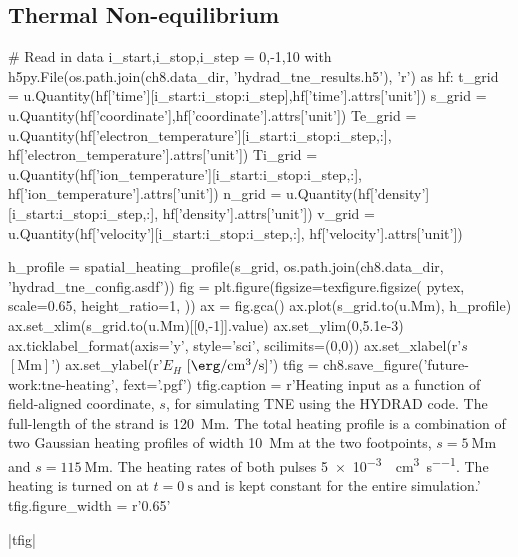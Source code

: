 \subsection{Thermal Non-equilibrium}\label{sec:tne}

\begin{pycode}[chapter8]
# Read in data
i_start,i_stop,i_step = 0,-1,10
with h5py.File(os.path.join(ch8.data_dir, 'hydrad_tne_results.h5'), 'r') as hf:
    t_grid = u.Quantity(hf['time'][i_start:i_stop:i_step],hf['time'].attrs['unit'])
    s_grid = u.Quantity(hf['coordinate'],hf['coordinate'].attrs['unit'])
    Te_grid = u.Quantity(hf['electron_temperature'][i_start:i_stop:i_step,:],
                         hf['electron_temperature'].attrs['unit'])
    Ti_grid = u.Quantity(hf['ion_temperature'][i_start:i_stop:i_step,:],
                         hf['ion_temperature'].attrs['unit'])
    n_grid = u.Quantity(hf['density'][i_start:i_stop:i_step,:],
                        hf['density'].attrs['unit'])
    v_grid = u.Quantity(hf['velocity'][i_start:i_stop:i_step,:],
                        hf['velocity'].attrs['unit'])
\end{pycode}

\begin{pycode}[chapter8]
h_profile = spatial_heating_profile(s_grid, os.path.join(ch8.data_dir, 'hydrad_tne_config.asdf'))
fig = plt.figure(figsize=texfigure.figsize(
    pytex,
    scale=0.65,
    height_ratio=1,
))
ax = fig.gca()
ax.plot(s_grid.to(u.Mm), h_profile)
ax.set_xlim(s_grid.to(u.Mm)[[0,-1]].value)
ax.set_ylim(0,5.1e-3)
ax.ticklabel_format(axis='y', style='sci', scilimits=(0,0))
ax.set_xlabel(r'$s$ $[\si{\mega\m}]$')
ax.set_ylabel(r'$E_H$ $[\si{\erg\per\cubic\cm\per\second}]$')
tfig = ch8.save_figure('future-work:tne-heating', fext='.pgf')
tfig.caption = r'Heating input as a function of field-aligned coordinate, $s$, for simulating TNE using the HYDRAD code. The full-length of the strand is \SI{120}{\mega\m}. The total heating profile is a combination of two Gaussian heating profiles of width \SI{10}{\mega\m} at the two footpoints, $s=\SI{5}{\mega\m}$ and $s=\SI{115}{\mega\m}$. The heating rates of both pulses \SI{5e-3}{\erg\per\cubic\cm\per\second}. The heating is turned on at $t=\SI{0}{\second}$ and is kept constant for the entire simulation.'
tfig.figure_width = r'0.65\textwidth'
\end{pycode}
\py[chapter8]|tfig|

